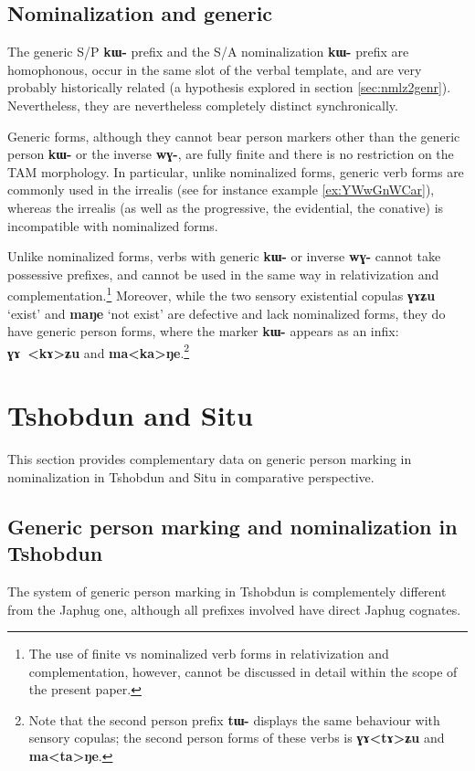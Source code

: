 \documentclass[oneside,a4paper,11pt]{article}
\newcommand{\ipa}[1]{\textbf{\phon\mbox{#1}}} %
\begin{document}
 

 \subsection{Nominalization and generic}  
The generic S/P \ipa{kɯ-} prefix and the S/A nominalization \ipa{kɯ-} prefix are homophonous, occur in the same slot of the verbal template, and are very probably historically related (a hypothesis explored in section \ref{sec:nmlz2genr}). Nevertheless, they are nevertheless completely distinct synchronically. 

Generic forms, although they cannot bear person markers other than the generic  person \ipa{kɯ-} or the inverse \ipa{wɣ-}, are fully finite and there is no restriction on the TAM morphology. In particular, unlike nominalized forms, generic verb forms are commonly used in the irrealis (see for instance example \ref{ex:YWwGnWCar}), whereas the irrealis (as well as the progressive, the evidential, the conative) is incompatible with  nominalized forms.

Unlike nominalized forms,  verbs with generic \ipa{kɯ-} or   inverse \ipa{wɣ-} cannot take possessive prefixes, and cannot be used in the same way in relativization and complementation.\footnote{The use of finite vs nominalized verb forms in relativization and complementation, however, cannot be discussed in detail within the scope of the present paper.} Moreover, while the  two sensory existential copulas \ipa{ɣɤʑu} `exist' and \ipa{maŋe} `not exist'  are defective and lack nominalized forms, they do have generic person forms, where the marker \ipa{kɯ-}   appears  as an infix: \ipa{ɣɤ
<kɤ>ʑu} and \ipa{ma<ka>ŋe}.\footnote{Note that the second person prefix \ipa{tɯ-} displays the same behaviour with sensory copulas; the second person forms of these verbs is \ipa{ɣɤ<tɤ>ʑu} and \ipa{ma<ta>ŋe}. } 

 \section{Tshobdun and Situ}

This section provides complementary data on generic person marking in nominalization in Tshobdun and Situ in comparative perspective.

\subsection{Generic person marking and nominalization in Tshobdun} \label{tshobdun.genr}
The system of generic person marking in Tshobdun is complementely different from the Japhug one, although all prefixes involved have direct Japhug cognates.
\end{document}
